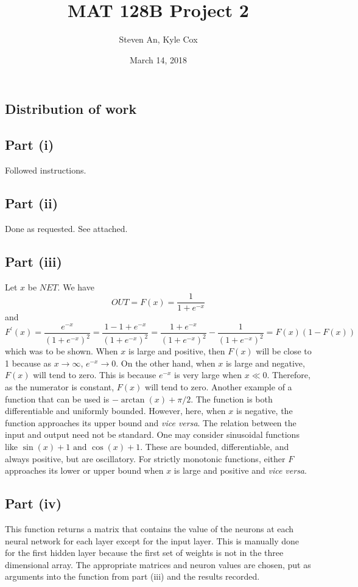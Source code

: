 \documentclass[12pt]{article}
\begin{document}
 
\title{MAT 128B Project 2}
\author{Steven An, Kyle Cox}
\date{March 14, 2018}
\maketitle

\subsection*{Distribution of work}


\subsection*{Part (i)}
Followed instructions.

\subsection*{Part (ii)}
Done as requested.  
See attached.

\subsection*{Part (iii)}
Let $x$ be $NET$.
We have 
\[OUT = F(x) = \frac{1}{1+e^{-x}}\]
and
\[F^\prime(x) = \frac{e^{-x}}{(1+e^{-x})^2} = \frac{1-1+e^{-x}}{(1+e^{-x})^2} = \frac{1+e^{-x}}{(1+e^{-x})^2} -\frac{1}{(1+e^{-x})^2} = F(x)(1-F(x))\]
which was to be shown.
When $x$ is large and positive, then $F(x)$ will be close to 1 because as $x\rightarrow\infty$, $e^{-x}\rightarrow 0$.
On the other hand, when $x$ is large and negative, $F(x)$ will tend to zero.
This is because $e^{-x}$ is very large when $x\ll 0$.
Therefore, as the numerator is constant, $F(x)$ will tend to zero.
Another example of a function that can be used is $-\arctan\left(x\right) + \pi/2$.
The function is both differentiable and uniformly bounded.
However, here, when $x$ is negative, the function approaches its upper bound and \textit{vice versa}.
The relation between the input and output need not be standard.
One may consider sinusoidal functions like $\sin(x)+1 \text{ and }\cos(x)+1$.
These are bounded, differentiable, and always positive, but are oscillatory.
For strictly monotonic functions, either $F$ approaches its lower or upper bound when $x$ is large and positive and \textit{vice versa}.
\subsection*{Part (iv)}
This function returns a matrix that contains the value of the neurons at each neural network for each layer except for the input layer.
This is manually done for the first hidden layer because the first set of weights is not in the three dimensional array.
The appropriate matrices and neuron values are chosen, put as arguments into the function from part (iii) and the results recorded.
\end{document}
